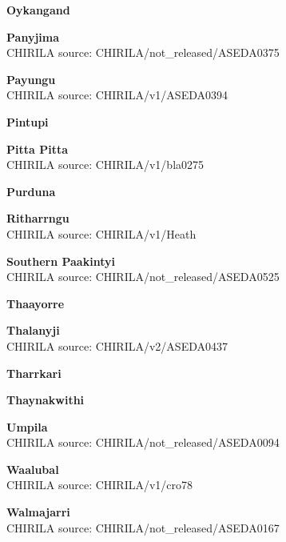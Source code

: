 \textbf{Oykangand}\\

\textbf{Panyjima}\\
CHIRILA source: CHIRILA/not\_released/ASEDA0375


\textbf{Payungu}\\
CHIRILA source: CHIRILA/v1/ASEDA0394


\textbf{Pintupi}\\

\textbf{Pitta Pitta}\\
CHIRILA source: CHIRILA/v1/bla0275


\textbf{Purduna}\\

\textbf{Ritharrngu}\\
CHIRILA source: CHIRILA/v1/Heath


\textbf{Southern Paakintyi}\\
CHIRILA source: CHIRILA/not\_released/ASEDA0525


\textbf{Thaayorre}\\

\textbf{Thalanyji}\\
CHIRILA source: CHIRILA/v2/ASEDA0437


\textbf{Tharrkari}\\

\textbf{Thaynakwithi}\\

\textbf{Umpila}\\
CHIRILA source: CHIRILA/not\_released/ASEDA0094


\textbf{Waalubal}\\
CHIRILA source: CHIRILA/v1/cro78


\textbf{Walmajarri}\\
CHIRILA source: CHIRILA/not\_released/ASEDA0167

